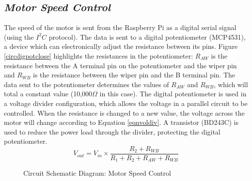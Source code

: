 \documentclass[a4]{report}
\begin{document}
	\subsection{\textit{Motor Speed Control}}
	The speed of the motor is sent from the Raspberry Pi as a digital serial signal (using the \(I^2C\) protocol). The data is sent to a digital potentiometer (MCP4531), a device which can electronically adjust the resistance between its pins. Figure \ref{circdigpotclose} highlights the resistances in the potentiometer: \(R_{AW}\) is the resistance between the A terminal pin on the potentiometer and the wiper pin and \(R_{WB}\) is the resistance between the wiper pin and the B terminal pin. The data sent to the potentiometer determines the values of \(R_{AW}\) and \(R_{WB}\), which will total a constant value (10,000\(\Omega \) in this case). The digital potentiometer is used in a voltage divider configuration, which allows the voltage in a parallel circuit to be controlled. When the resistance is changed to a new value, the voltage across the motor will change according to Equation \ref{eqnvoldiv}. A transistor (BD243C) is used to reduce the power load through the divider, protecting the digital potentiometer. \newline
	\begin{equation}
		V_{out} = V_{in}\times \frac{R_2 + R_{WB}}{R_1 + R_2 + R_{AW} + R_{WB}}
		\label{eqnvoldiv}
	\end{equation}
	\begin{figure}[!h]
		\centering
		\caption{Circuit Schematic Diagram: Motor Speed Control}
		\label{circspeedcontr}
	\end{figure} \newline  \noindent
\end{document}
